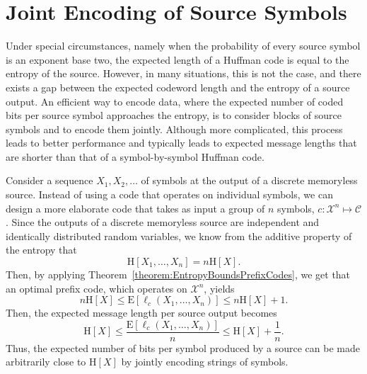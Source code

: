 \section{Joint Encoding of Source Symbols}

Under special circumstances, namely when the probability of every source symbol is an exponent base two, the expected length of a Huffman code is equal to the entropy of the source.
However, in many situations, this is not the case, and there exists a gap between the expected codeword length and the entropy of a source output.
An efficient way to encode data, where the expected number of coded bits per source symbol approaches the entropy, is to consider blocks of source symbols and to encode them jointly.
Although more complicated, this process leads to better performance and typically leads to expected message lengths that are shorter  than that of a symbol-by-symbol Huffman code.

Consider a sequence $X_1, X_2, \ldots$ of symbols at the output of a discrete memoryless source.
Instead of using a code that operates on individual symbols, we can design a more elaborate code that takes as input a group of $n$ symbols, $c: \mathcal{X}^n \mapsto \mathcal{C}$.
Since the outputs of a discrete memoryless source are independent and identically distributed random variables, we know from the additive property of the entropy that
\begin{equation*}
\mathrm{H}[X_1, \ldots, X_n ] = n \mathrm{H} [X] .
\end{equation*}
Then, by applying Theorem~\ref{theorem:EntropyBoundsPrefixCodes}, we get that an optimal prefix code, which operates on $\mathcal{X}^n$, yields
\begin{equation*}
n \mathrm{H}[X] \leq \mathrm{E} [ \ell_c (X_1, \ldots, X_n) ] \leq n \mathrm{H}[X] + 1.
\end{equation*}
Then, the expected message length per source output becomes
\begin{equation*}
\mathrm{H}[X] \leq \frac{ \mathrm{E} [ \ell_c (X_1, \ldots, X_n) ] }{n} \leq \mathrm{H}[X] + \frac{1}{n} .
\end{equation*}
Thus, the expected number of bits per symbol produced by a source can be made arbitrarily close to $\mathrm{H}[X]$ by jointly encoding strings of symbols.

